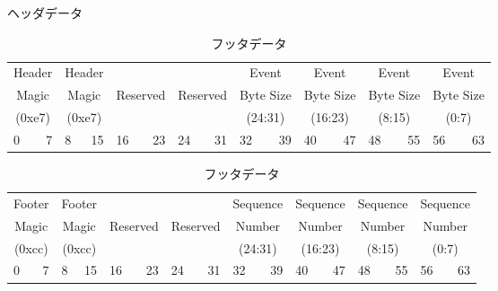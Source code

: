 \documentclass[a4j,10pt,dvips,onecolumn,oneside,final]{jarticle}%
\begin{document}
\begin{table}[h]
\begin{center}
\caption{ヘッダデータ}
\label{tbl:header}
\begin{tabular}{ l r l r l r l r l r l r l r l r}
\hline
\multicolumn{2}{|c|}{Header} & \multicolumn{2}{|c|}{Header} & \multicolumn{2}{|c|}{} & \multicolumn{2}{|c|}{} & \multicolumn{2}{|c|}{Event} & \multicolumn{2}{|c|}{Event} & \multicolumn{2}{|c|}{Event} & \multicolumn{2}{|c|}{Event} \\
\multicolumn{2}{|c|}{Magic}  & \multicolumn{2}{|c|}{Magic}  & \multicolumn{2}{|c|}{Reserved} & \multicolumn{2}{|c|}{Reserved} & \multicolumn{2}{|c|}{Byte Size} & \multicolumn{2}{|c|}{Byte Size} & \multicolumn{2}{|c|}{Byte Size} & \multicolumn{2}{|c|}{Byte Size}\\
\multicolumn{2}{|c|}{(0xe7)} & \multicolumn{2}{|c|}{(0xe7)} & \multicolumn{2}{|c|}{} & \multicolumn{2}{|c|}{} & \multicolumn{2}{|c|}{(24:31)} & \multicolumn{2}{|c|}{(16:23)} & \multicolumn{2}{|c|}{(8:15)} & \multicolumn{2}{|c|}{(0:7)}\\
\hline
0 & 7 & 8 & 15 & 16 & 23 & 24 & 31 & 32 & 39 & 40 & 47 & 48 & 55 & 56 & 63
\end{tabular}
\end{center}

\begin{center}
\caption{フッタデータ}
\label{tbl:footer}
\begin{tabular}{ l r l r l r l r l r l r l r l r}
\hline
\multicolumn{2}{|c|}{Footer} & \multicolumn{2}{|c|}{Footer} & \multicolumn{2}{|c|}{} & \multicolumn{2}{|c|}{} & \multicolumn{2}{|c|}{Sequence} & \multicolumn{2}{|c|}{Sequence} & \multicolumn{2}{|c|}{Sequence} & \multicolumn{2}{|c|}{Sequence} \\
\multicolumn{2}{|c|}{Magic}  & \multicolumn{2}{|c|}{Magic}  & \multicolumn{2}{|c|}{Reserved} & \multicolumn{2}{|c|}{Reserved} & \multicolumn{2}{|c|}{Number} & \multicolumn{2}{|c|}{Number} & \multicolumn{2}{|c|}{Number} & \multicolumn{2}{|c|}{Number}\\
\multicolumn{2}{|c|}{(0xcc)} & \multicolumn{2}{|c|}{(0xcc)} & \multicolumn{2}{|c|}{} & \multicolumn{2}{|c|}{} & \multicolumn{2}{|c|}{(24:31)} & \multicolumn{2}{|c|}{(16:23)} & \multicolumn{2}{|c|}{(8:15)} & \multicolumn{2}{|c|}{(0:7)}\\
\hline
0 & 7 & 8 & 15 & 16 & 23 & 24 & 31 & 32 & 39 & 40 & 47 & 48 & 55 & 56 & 63
\end{tabular}
\end{center}
\end{table}
\end{document}
